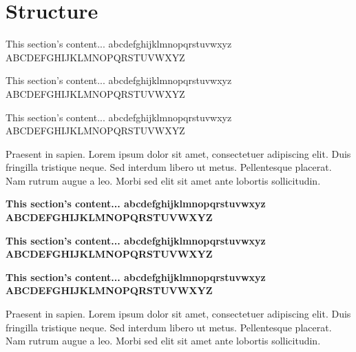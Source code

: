 \clearpage %

\section*{Structure}
\small{This section's content... \newline
abcdefghijklmnopqrstuvwxyz \newline
ABCDEFGHIJKLMNOPQRSTUVWXYZ }

\tiny{This section's content... \newline
abcdefghijklmnopqrstuvwxyz \newline
ABCDEFGHIJKLMNOPQRSTUVWXYZ }

\normalsize{This section's content... \newline
abcdefghijklmnopqrstuvwxyz \newline
ABCDEFGHIJKLMNOPQRSTUVWXYZ }

Praesent in sapien. Lorem ipsum dolor sit amet, consectetuer adipiscing elit.
Duis fringilla tristique neque. Sed interdum libero ut metus. Pellentesque placerat.
Nam rutrum augue a leo. Morbi sed elit sit amet ante lobortis sollicitudin.

\textbf{
\small{This section's content... \newline
abcdefghijklmnopqrstuvwxyz \newline
ABCDEFGHIJKLMNOPQRSTUVWXYZ }}

\textbf{
\tiny{This section's content... \newline
abcdefghijklmnopqrstuvwxyz \newline
ABCDEFGHIJKLMNOPQRSTUVWXYZ }}

\textbf{
\normalsize{This section's content... \newline
abcdefghijklmnopqrstuvwxyz \newline
ABCDEFGHIJKLMNOPQRSTUVWXYZ }}

Praesent in sapien. Lorem ipsum dolor sit amet, consectetuer adipiscing elit.
Duis fringilla tristique neque. Sed interdum libero ut metus. Pellentesque placerat.
Nam rutrum augue a leo. Morbi sed elit sit amet ante lobortis sollicitudin.

